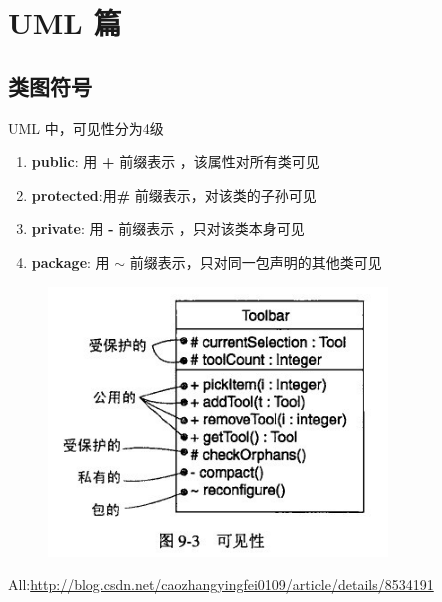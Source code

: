 \documentclass[UTF8,a4paper,12pt]{ctexbook}
\begin{document}
\chapter{UML 篇}
\section{类图符号}
	UML 中，可见性分为4级
	\begin{enumerate}[itemindent = 1em]
		\item \textbf{public}:	用 \textbf{+} 前缀表示 ，该属性对所有类可见
		\item \textbf{protected}:用\textbf{\#} 前缀表示，对该类的子孙可见
		\item \textbf{private}:	用 \textbf{-} 前缀表示 ，只对该类本身可见
		\item \textbf{package}:	用 \textbf{$\sim$} 前缀表示，只对同一包声明的其他类可见
	\end{enumerate}

	\begin{figure}[h]
		\centering
		\includegraphics[width = 9cm]{Simbol_UML.jpg}
	\end{figure}
	
	All:\url{http://blog.csdn.net/caozhangyingfei0109/article/details/8534191}
\newpage
\end{document}
